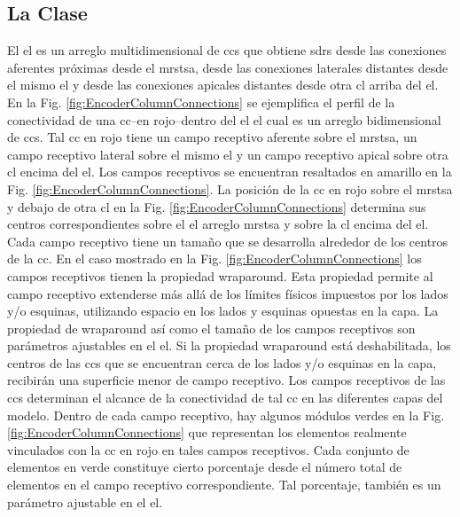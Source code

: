 \subsection{La Clase }

El \gls{el} es un arreglo multidimensional de \glspl{cc} que obtiene \glspl{sdr} desde las conexiones aferentes próximas desde el \gls{mrstsa}, desde las conexiones laterales distantes desde el mismo \gls{el} y desde las conexiones apicales distantes desde otra \gls{cl} arriba del \gls{el}. En la Fig. \ref{fig:EncoderColumnConnections} se ejemplifica el perfil de la conectividad de una \gls{cc}--en rojo--dentro del \gls{el} el cual es un arreglo bidimensional de \glspl{cc}. Tal \gls{cc} en rojo tiene un campo receptivo aferente sobre el \gls{mrstsa}, un campo receptivo lateral sobre el mismo \gls{el} y un campo receptivo apical sobre otra \gls{cl} encima del \gls{el}. Los campos receptivos se encuentran resaltados en amarillo en la Fig. \ref{fig:EncoderColumnConnections}. La posición de la \gls{cc} en rojo sobre el \gls{mrstsa} y debajo de otra \gls{cl} en la Fig. \ref{fig:EncoderColumnConnections} determina sus centros correspondientes sobre el el arreglo \gls{mrstsa} y sobre la \gls{cl} encima del \gls{el}. Cada campo receptivo tiene un tamaño que se desarrolla alrededor de los centros de la \gls{cc}. En el caso mostrado en la Fig. \ref{fig:EncoderColumnConnections} los campos receptivos tienen la propiedad wraparound. Esta propiedad permite al campo receptivo extenderse más allá de los límites físicos impuestos por los lados y/o esquinas, utilizando espacio en los lados y esquinas opuestas en la capa. La propiedad de wraparound así como el tamaño de los campos receptivos son parámetros ajustables en el \gls{el}. Si la propiedad wraparound está deshabilitada, los centros de las \glspl{cc} que se encuentran cerca de los lados y/o esquinas en la capa, recibirán una superficie menor de campo receptivo. Los campos receptivos de las \glspl{cc} determinan el alcance de la conectividad de tal \gls{cc} en las diferentes capas del modelo. Dentro de cada campo receptivo, hay algunos módulos verdes en la Fig. \ref{fig:EncoderColumnConnections} que representan los elementos realmente vinculados con la \gls{cc} en rojo en tales campos receptivos. Cada conjunto de elementos en verde constituye cierto porcentaje desde el número total de elementos en el campo receptivo correspondiente. Tal porcentaje, también es un parámetro ajustable en el \gls{el}. 


